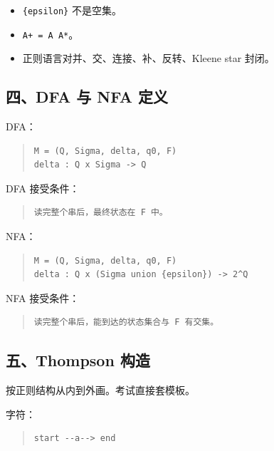 \documentclass[UTF8,zihao=-4]{ctexart}
\begin{document}
\begin{itemize}
\item \texttt{\{epsilon\}} 不是空集。
\item \texttt{A+ = A A*}。
\item 正则语言对并、交、连接、补、反转、Kleene star 封闭。
\end{itemize}


\subsection{四、DFA 与 NFA 定义}


DFA：


\begin{quote}
\footnotesize
\begin{verbatim}
M = (Q, Sigma, delta, q0, F)
delta : Q x Sigma -> Q
\end{verbatim}
\end{quote}


DFA 接受条件：


\begin{quote}
\footnotesize
\begin{verbatim}
读完整个串后，最终状态在 F 中。
\end{verbatim}
\end{quote}


NFA：


\begin{quote}
\footnotesize
\begin{verbatim}
M = (Q, Sigma, delta, q0, F)
delta : Q x (Sigma union {epsilon}) -> 2^Q
\end{verbatim}
\end{quote}


NFA 接受条件：


\begin{quote}
\footnotesize
\begin{verbatim}
读完整个串后，能到达的状态集合与 F 有交集。
\end{verbatim}
\end{quote}


\subsection{五、Thompson 构造}


按正则结构从内到外画。考试直接套模板。


字符：


\begin{quote}
\footnotesize
\begin{verbatim}
start --a--> end
\end{verbatim}
\end{quote}
\end{document}
